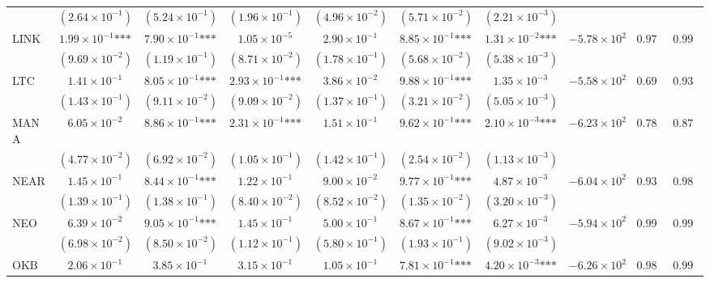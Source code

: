 \documentclass{article}
\begin{document}
\begin{landscape}
\begin{longtable}{lccccccccc}
 & $(2.64\times 10^{-1})$ & $(5.24\times 10^{-1})$ & $(1.96\times 10^{-1})$ & $(4.96\times 10^{-2})$ & $(5.71\times 10^{-2})$ & $(2.21\times 10^{-3})$ &  &  &  \\
LINK & $1.99\times 10^{-1}\text{***}$ & $7.90\times 10^{-1}\text{***}$ & $1.05\times 10^{-5}$ & $2.90\times 10^{-1}$ & $8.85\times 10^{-1}\text{***}$ & $1.31\times 10^{-2}\text{***}$ & $-5.78\times 10^{2}$ & $0.975$ & $0.991$ \\
 & $(9.69\times 10^{-2})$ & $(1.19\times 10^{-1})$ & $(8.71\times 10^{-2})$ & $(1.78\times 10^{-1})$ & $(5.68\times 10^{-2})$ & $(5.38\times 10^{-3})$ &  &  &  \\
LTC & $1.41\times 10^{-1}$ & $8.05\times 10^{-1}\text{***}$ & $2.93\times 10^{-1}\text{***}$ & $3.86\times 10^{-2}$ & $9.88\times 10^{-1}\text{***}$ & $1.35\times 10^{-3}$ & $-5.58\times 10^{2}$ & $0.697$ & $0.939$ \\
 & $(1.43\times 10^{-1})$ & $(9.11\times 10^{-2})$ & $(9.09\times 10^{-2})$ & $(1.37\times 10^{-1})$ & $(3.21\times 10^{-2})$ & $(5.05\times 10^{-3})$ &  &  &  \\
MANA & $6.05\times 10^{-2}$ & $8.86\times 10^{-1}\text{***}$ & $2.31\times 10^{-1}\text{***}$ & $1.51\times 10^{-1}$ & $9.62\times 10^{-1}\text{***}$ & $2.10\times 10^{-3}\text{***}$ & $-6.23\times 10^{2}$ & $0.789$ & $0.879$ \\
 & $(4.77\times 10^{-2})$ & $(6.92\times 10^{-2})$ & $(1.05\times 10^{-1})$ & $(1.42\times 10^{-1})$ & $(2.54\times 10^{-2})$ & $(1.13\times 10^{-3})$ &  &  &  \\
NEAR & $1.45\times 10^{-1}$ & $8.44\times 10^{-1}\text{***}$ & $1.22\times 10^{-1}$ & $9.00\times 10^{-2}$ & $9.77\times 10^{-1}\text{***}$ & $4.87\times 10^{-3}$ & $-6.04\times 10^{2}$ & $0.934$ & $0.988$ \\
 & $(1.39\times 10^{-1})$ & $(1.38\times 10^{-1})$ & $(8.40\times 10^{-2})$ & $(8.52\times 10^{-2})$ & $(1.35\times 10^{-2})$ & $(3.20\times 10^{-3})$ &  &  &  \\
NEO & $6.39\times 10^{-2}$ & $9.05\times 10^{-1}\text{***}$ & $1.45\times 10^{-1}$ & $5.00\times 10^{-1}$ & $8.67\times 10^{-1}\text{***}$ & $6.27\times 10^{-3}$ & $-5.94\times 10^{2}$ & $0.993$ & $0.991$ \\
 & $(6.98\times 10^{-2})$ & $(8.50\times 10^{-2})$ & $(1.12\times 10^{-1})$ & $(5.80\times 10^{-1})$ & $(1.93\times 10^{-1})$ & $(9.02\times 10^{-3})$ &  &  &  \\
OKB & $2.06\times 10^{-1}$ & $3.85\times 10^{-1}$ & $3.15\times 10^{-1}$ & $1.05\times 10^{-1}$ & $7.81\times 10^{-1}\text{***}$ & $4.20\times 10^{-3}\text{***}$ & $-6.26\times 10^{2}$ & $0.986$ & $0.994$ \\

\end{longtable}
\end{landscape}
\end{document}
